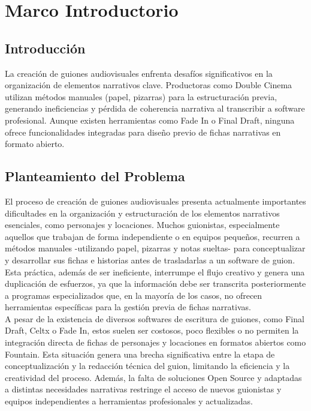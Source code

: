 \documentclass[12pt]{article}
\begin{document}
	\clearpage

	\tableofcontents
	\newpage

	\section{Marco Introductorio}

	\subsection{Introducción}

	La creación de guiones audiovisuales enfrenta desafíos significativos en la organización de elementos narrativos clave. Productoras como Double Cinema utilizan métodos manuales (papel, pizarras) para la estructuración previa, generando ineficiencias y pérdida de coherencia narrativa al transcribir a software profesional. Aunque existen herramientas como Fade In o Final Draft, ninguna ofrece funcionalidades integradas para diseño previo de fichas narrativas en formato abierto.

	\newpage

	\subsection{Planteamiento del Problema}

	El proceso de creación de guiones audiovisuales presenta actualmente importantes dificultades en la organización y estructuración de los elementos narrativos esenciales, como personajes y locaciones. Muchos guionistas, especialmente aquellos que trabajan de forma independiente o en equipos pequeños, recurren a métodos manuales -utilizando papel, pizarras y notas sueltas- para conceptualizar y desarrollar sus fichas e historias antes de trasladarlas a un software de guion. Esta práctica, además de ser ineficiente, interrumpe el flujo creativo y genera una duplicación de esfuerzos, ya que la información debe ser transcrita posteriormente a programas especializados que, en la mayoría de los casos, no ofrecen herramientas específicas para la gestión previa de fichas narrativas. \\

	A pesar de la existencia de diversos softwares de escritura de guiones, como Final Draft, Celtx o Fade In, estos suelen ser costosos, poco flexibles o no permiten la integración directa de fichas de personajes y locaciones en formatos abiertos como Fountain. Esta situación genera una brecha significativa entre la etapa de conceptualización y la redacción técnica del guion, limitando la eficiencia y la creatividad del proceso. Además, la falta de soluciones Open Source y adaptadas a distintas necesidades narrativas restringe el acceso de nuevos guionistas y equipos independientes a herramientas profesionales y actualizadas. \\
\end{document}
